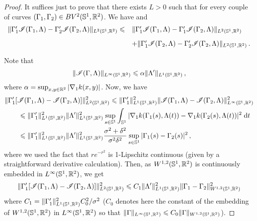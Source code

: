 \begin{proof}
It suffices just to prove that there exists $L>0$ such that
for every couple of curves $(\Gamma_1, \Gamma_2) \in BV^2(\mathbb{S}^1,\mathbb{R}^2)$. We have
and
\begin{equation}\label{lip1}
\begin{array}{ll}
	\|\GA'_1\Ii(\GA_1,\La) - \GA'_2\Ii(\GA_2,\La)\|_{L^2(\Circ,\RR^2)} \leq &  \|\GA'_1\Ii(\GA_1,\La) - \GA'_1\Ii(\GA_2,\La)\|_{L^2(\Circ,\RR^2)}  \vspace{0.3cm}\\
	 &+ \|\GA'_1\Ii(\GA_2,\La) - \GA'_2\Ii(\GA_2,\La)\|_{L^2(\Circ,\RR^2)}\,.
	\end{array}
\end{equation}


Note that
\begin{equation}\label{boundI}
	\| \mathcal{I}(\Gamma,\Lambda) \|_{L^\infty(\mathbb{S}^1,\mathbb{R}^2)}\leqslant  
	\alpha \| \Lambda' \|_{L^1(\mathbb{S}^1,\mathbb{R}^2)}\,,
\end{equation}
where $\alpha = \sup_{x,y \in {\mathbb R}^2} |\nabla_1 k(x,y)|$.
Now, we have
\begin{align*}
	& \|\Gamma'_1[\mathcal{I}(\Gamma_1,\Lambda)-\mathcal{I}(\Gamma_2,\Lambda)]\|^2_{L^2(\mathbb{S}^1,\mathbb{R}^2)} \leqslant \| \Gamma'_1 \|_{L^1(\mathbb{S}^1,\mathbb{R}^2)}^2 \|\mathcal{I}(\Gamma_1,\Lambda)-\mathcal{I}(\Gamma_2,\Lambda)\|^2_{L^\infty(\mathbb{S}^1,\mathbb{R}^2)}  \\
	& \qquad \leqslant  \| \Gamma'_1 \|_{L^1(\mathbb{S}^1,\mathbb{R}^2)}^2 \| \Lambda' \|^2_{L^1(\mathbb{S}^1,\mathbb{R}^2)} \sup_{s\in \mathbb{S}^1}  \int_{\mathbb{S}^1}|\nabla_1k(\Gamma_1(s),\Lambda(t))-\nabla_1k(\Gamma_2(s),\Lambda(t))|^2\;  \mathrm{d} t \\
	&\qquad \leqslant  \| \Gamma'_1 \|_{L^1(\mathbb{S}^1,\mathbb{R}^2)}^2 \| \Lambda' \|^2_{L^1(\mathbb{S}^1,\mathbb{R}^2)} \frac{\sigma^2+\delta^2}{\sigma^2\delta^2}\sup_{s\in \mathbb{S}^1} | \Gamma_1(s) - \Gamma_2(s)|^2\,,
\end{align*}
where we used  the fact that $r e^{-r^2}$ is 1-Lipschitz continuous (given by a straightforward derivative calculation). Then, as $W^{1,2}(\mathbb{S}^1,\mathbb{R}^2)$ is continuously embedded in $L^\infty(\mathbb{S}^1,\mathbb{R}^2)$, we get
\begin{equation}\label{lip2}
	\|  \Gamma'_1[\mathcal{I}(\Gamma_1,\Lambda)-\mathcal{I}(\Gamma_2,\Lambda)]  \|^2_{L^2(\mathbb{S}^1,\mathbb{R}^2)} 
	\leqslant 
	C_1 \| \Lambda' \|^2_{L^1(\mathbb{S}^1,\mathbb{R}^2)} \| \Gamma_1-\Gamma_2 \|^2_{W^{1,2}(\mathbb{S}^1,\mathbb{R}^2)} 
\end{equation}
where $C_1 =  \| \Gamma'_1 \|_{L^1(\mathbb{S}^1,\mathbb{R}^2)}^2 C_0^2/\sigma^2$ ($C_0$ denotes here  the constant of the embedding of $W^{1,2}(\mathbb{S}^1,\mathbb{R}^2)$ in $L^\infty(\mathbb{S}^1,\mathbb{R}^2)$ so that $\|\Gamma\|_{L^\infty(\mathbb{S}^1,\mathbb{R}^2)}\leqslant C_0 \|\Gamma\|_{W^{1,2}(\mathbb{S}^1,\mathbb{R}^2)}$). 


\end{proof}
